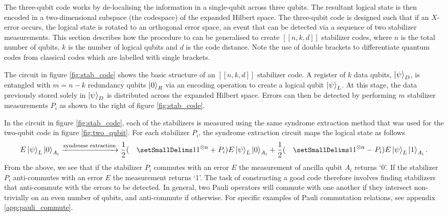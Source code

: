 \documentclass[]{arxiv}
\theoremstyle{plain}%
\theoremstyle{definition}
\theoremstyle{remark}
\DeclareRobustCommand\openone{\leavevmode\hbox{\small1\normalsize\kern-.33em1}}
\begin{document}
The three-qubit code works by de-localising the information in a single-qubit across three qubits. The resultant logical state is then encoded in a two-dimensional subspace (the codespace) of the expanded Hilbert space. The three-qubit code is designed such that if an $X$-error occurs, the logical state is rotated to an orthogonal error space, an event that can be detected via a sequence of two stabilizer measurements. This section describes how the procedure to can be generalised to create $[[n,k,d]]$ stabilizer codes, where $n$ is the total number of qubits, $k$ is the number of logical qubits and $d$ is the code distance. Note the use of double brackets to differentiate quantum codes from classical codes which are labelled with single brackets. 

The circuit in figure \ref{fig:stab_code} shows the basic structure of an $[[n,k,d]]$ stabilizer code. A register of $k$ data qubits, $\ket{\psi}_D$, is entangled with $m=n-k$ redundancy qubits $\ket{0}_R$ via an encoding operation to create a logical qubit $\ket{\psi}_L$. At this stage, the data previously stored solely in $\ket{\psi}_D$ is distributed across the expanded Hilbert space. Errors can then be detected by performing $m$ stabilizer measurements $P_i$ as shown to the right of figure \ref{fig:stab_code}.

In the circuit in figure \ref{fig:stab_code}, each of the stabilizers is measured using the same syndrome extraction method that was used for the two-qubit code in figure \ref{fig:two_qubit}. For each stabilizer $P_i$, the syndrome extraction circuit maps the logical state as follows
%
\begin{equation}\label{eq:synd_extract_gen}
E\ket{\psi}_L \ket{0}_{A_i} \xrightarrow[]{\text{syndrome extraction}} \dfrac{1}{2}(\openone^{\otimes n} + P_i)E\ket{\psi}_L \ket{0}_{A_i} + \dfrac{1}{2}(\openone^{\otimes n} - P_i)E\ket{\psi}_L \ket{1}_{A_i}\rm.
\end{equation}
%
From the above, we see that if the stabilizer $P_i$ commutes with an error $E$ the measurement of ancilla qubit $A_i$ returns `0'. If the stabilizer $P_i$ anti-commutes with an error $E$ the measurement returns `1'. The task of constructing a good code therefore involves finding stabilizers that anti-commute with the errors to be detected. In general, two Pauli operators will commute with one another if they intersect non-trivially on an even number of qubits, and anti-commute if otherwise. For specific examples of Pauli commutation relations, see appendix \ref{app:pauli_commute}.   
\end{document}
